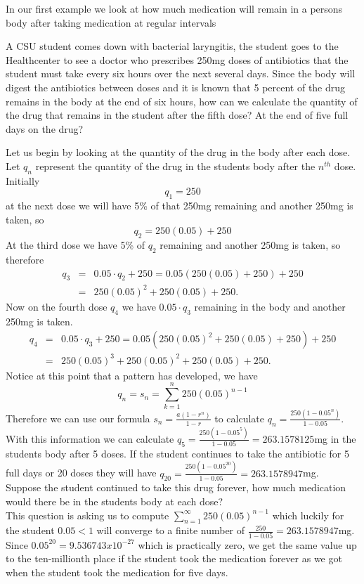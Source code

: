 In our first example we
look at how much
medication will remain in a persons body after taking medication at
regular intervals
\begin{Example}
A CSU student comes down with bacterial laryngitis, the student goes
to the Healthcenter to see a doctor who prescribes 250mg doses of
antibiotics that the student must take every six hours over the next
several days.  Since the body will digest the antibiotics between
doses and it is known that 5 percent of the drug remains in the body
at the end of six hours, how can we calculate the quantity of the
drug that remains in the student after the fifth dose? At the end of
five full days on the drug?

\solution
Let us begin by looking at the quantity of the drug in the body
after each dose.  Let $q_{n}$ represent the quantity of the drug in
the students body after the $n^{th}$ dose.  Initially $$ q_{1}=250$$
at the next dose we will have 5\% of that 250mg remaining and
another 250mg is taken, so $$q_{2}=250(0.05)+250$$ At the third dose
we have 5\% of $q_{2}$ remaining and another 250mg is taken, so
therefore
\begin{eqnarray*}
q_{3}&=&0.05 \cdot q_{2} +250 =0.05(250(0.05)+250) +250\\
&=&250(0.05)^{2} + 250(0.05) + 250.
\end{eqnarray*}
Now on the fourth dose
$q_{4}$ we have $0.05 \cdot q_{3}$ remaining in the body and another
250mg is taken.
\begin{eqnarray*}
q_{4}&=&0.05 \cdot q_{3} + 250
=0.05(250(0.05)^{2} + 250(0.05) + 250) + 250\\
&=&250(0.05)^{3} + 250(0.05)^{2} + 250(0.05) + 250.
\end{eqnarray*}
Notice at this point that a
pattern has developed, we have $$q_{n}=s_{n}=\sum_{k=1}^{n}
250(0.05)^{n-1}$$ Therefore we can use our formula
$s_{n}=\frac{a(1-r^{n})}{1-r}$ to calculate
$q_{n}=\frac{250(1-0.05^{n})}{1-0.05}$.  With this information we
can calculate $q_{5}=\frac{250(1-0.05^{5})}{1-0.05} = 263.1578125$mg
in the students body after 5 doses.  If the student continues to
take the antibiotic for 5 full days or 20 doses they will have
$q_{20}=\frac{250(1-0.05^{20})}{1-0.05}=263.1578947$mg. \\

Suppose the student continued to take this drug forever, how much
medication would there be in the students body at each dose?\\

This question is asking us to compute
$\displaystyle{\sum_{n=1}^{\infty} 250(0.05)^{n-1}}$ which luckily
for the student $0.05<1$ will converge to a finite number of
$\frac{250}{1-0.05}=263.1578947$mg. Since $0.05^{20}=9.536743 x
10^{-27}$ which is practically zero, we get the same value up to the
ten-millionth place if the student took the medication forever as we
got when the student took the medication for five days.

\end{Example}

